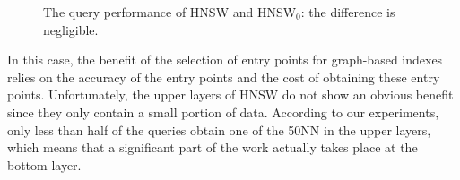 \documentclass[11pt]{article}
\begin{document}
\begin{figure}[tb]
    \centering
    \caption{The query performance of HNSW and HNSW$_0$: the difference is negligible.}
    \label{zeyu_fig:ablation}
\end{figure}
In this case, the benefit of the selection of entry points for graph-based indexes relies on the accuracy of the entry points and the cost of obtaining these entry points.
Unfortunately, the upper layers of HNSW do not show an obvious benefit since they only contain a small portion of data.
According to our experiments, only less than half of the queries obtain one of the 50NN in the upper layers, which means that a significant part of the work actually takes place at the bottom layer. 
\end{document}
